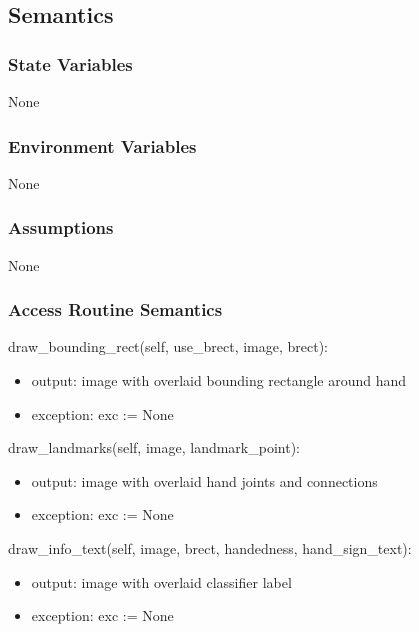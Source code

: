 \documentclass[12pt, titlepage]{article}
\begin{document}
\subsection{Semantics}

\subsubsection{State Variables}

None\\

\subsubsection{Environment Variables}

None\\

\subsubsection{Assumptions}

None

\subsubsection{Access Routine Semantics}

\noindent draw\_bounding\_rect(self, use\_brect, image, brect):
\begin{itemize}
\item output: image with overlaid bounding rectangle around hand\\
\item exception: exc := None\\
\end{itemize}

\noindent draw\_landmarks(self, image, landmark\_point):
\begin{itemize}
\item output: image with overlaid hand joints and connections\\
\item exception: exc := None\\
\end{itemize}

\noindent draw\_info\_text(self, image, brect, handedness, hand\_sign\_text):
\begin{itemize}
\item output:  image with overlaid classifier label\\
\item exception: exc := None\\
\end{itemize}
\end{document}
